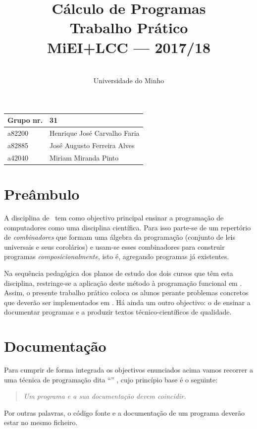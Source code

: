 \documentclass[a4paper]{article}
\title{
       	    Cálculo de Programas
\\
       	Trabalho Prático
\\
       	MiEI+LCC --- 2017/18
}
\author{
       	\dium
\\
       	Universidade do Minho
}
\date\mydate
\begin{document}
\maketitle

\begin{center}\large
\begin{tabular}{ll}
\textbf{Grupo} nr. & 31 
\\\hline
a82200 & Henrique José Carvalho Faria
\\
a82885 & José Augusto Ferreira Alves	
\\
a42040 & Miriam Miranda Pinto	
\\
\end{tabular}
\end{center}

\section{Preâmbulo}

A disciplina de \CP\ tem como objectivo principal ensinar
a progra\-mação de computadores como uma disciplina científica. Para isso
parte-se de um repertório de \emph{combinadores} que formam uma álgebra da
programação (conjunto de leis universais e seus corolários) e usam-se esses
combinadores para construir programas \emph{composicionalmente}, isto é,
agregando programas já existentes.
  
Na sequência pedagógica dos planos de estudo dos dois cursos que têm esta
disciplina, restringe-se a aplicação deste método à programação funcional
em \Haskell. Assim, 
o presente trabalho prático coloca os alunos perante problemas
concretos que deverão ser implementados em \Haskell.
Há ainda um outro objectivo: o de ensinar a documentar programas e
a produzir textos técnico-científicos de qualidade.

\section{Documentação}
Para cumprir de forma integrada os objectivos enunciados acima vamos recorrer
a uma técnica de programa\-ção dita ``'' \cite{Kn92}, cujo
princípio base é o seguinte:
\begin{quote}\em
Um programa e a sua documentação devem coincidir.
\end{quote}
Por outras palavras, o código fonte e a documentação de um programa deverão estar no
mesmo ficheiro.
\end{document}
